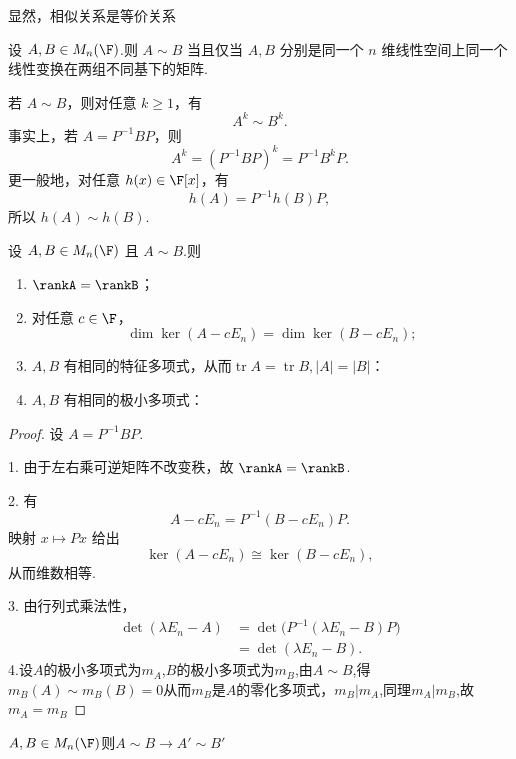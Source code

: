 显然，相似关系是等价关系

\begin{proposition}
	设 $A,B\in M_n(\F)$.则 $A\sim B$ 当且仅当 $A,B$ 分别是同一个 $n$ 维线性空间上同一个线性变换在两组不同基下的矩阵.
\end{proposition}

\begin{example}
	若 $A\sim B$，则对任意 $k\geq 1$，有
	\[
	A^k\sim B^k.
	\]
	事实上，若 $A=P^{-1}BP$，则
	\[
	A^k=(P^{-1}BP)^k=P^{-1}B^kP.
	\]
	更一般地，对任意 $h(x)\in\F[x]$，有
	\[
	h(A)=P^{-1}h(B)P,
	\]
	所以 $h(A)\sim h(B)$.
\end{example}

\begin{proposition}
	设 $A,B\in M_n(\F)$ 且 $A\sim B$.则
	\begin{enumerate}
		\item $\rankA=\rankB$；
		\item 对任意 $c\in\F$，
		\[
		\dim\ker(A-cE_n)=\dim\ker(B-cE_n);
		\]
		\item $A,B$ 有相同的特征多项式，从而$\operatorname{tr}A = \operatorname{tr}B,|A|=|B|$：
		\item $A,B$ 有相同的极小多项式：
	\end{enumerate}
\end{proposition}

\begin{proof}
	设 $A=P^{-1}BP$.
	
	1. 由于左右乘可逆矩阵不改变秩，故 $\rankA=\rankB$.
	
	2. 有
	\[
	A-cE_n=P^{-1}(B-cE_n)P.
	\]
	映射 $x\mapsto Px$ 给出
	\[
	\ker(A-cE_n)\cong\ker(B-cE_n),
	\]
	从而维数相等.
	
	3. 由行列式乘法性，
	\[
	\begin{aligned}
		\det(\lambda E_n-A)
		&=\det\bigl(P^{-1}(\lambda E_n-B)P\bigr) \\
		&=\det(\lambda E_n-B).
	\end{aligned}
	\]
	4.设$A$的极小多项式为$m_A $,$B$的极小多项式为$m_B $,由$A\sim B$,得$m_B(A)\sim m_B(B)=0$从而$m_B $是$A$的零化多项式，$m_B|m_A$,同理$m_A|m_B$,故$m_A=m_B$
\end{proof}
\begin{example}
	$A,B\in M_n(\F)$则$A\sim B\rightarrow A'\sim B'$
\end{example}

